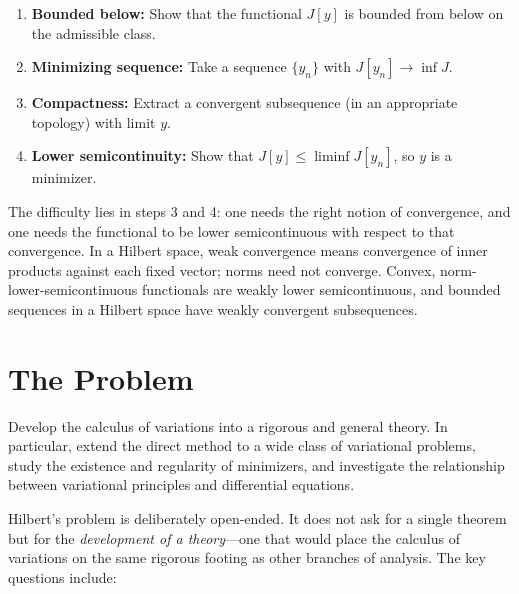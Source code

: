 \begin{enumerate}
    \item \textbf{Bounded below:} Show that the functional $J[y]$ is bounded from below on the admissible class.
    \item \textbf{Minimizing sequence:} Take a sequence $\{y_n\}$ with $J[y_n] \to \inf J$.
    \item \textbf{Compactness:} Extract a convergent subsequence (in an appropriate topology) with limit $y$.
    \item \textbf{Lower semicontinuity:} Show that $J[y] \leq \liminf J[y_n]$, so $y$ is a minimizer.
\end{enumerate}

The difficulty lies in steps 3 and 4: one needs the right notion of convergence, and one needs the functional to be lower semicontinuous with respect to that convergence. In a Hilbert space, weak convergence means convergence of inner products against each fixed vector; norms need not converge. Convex, norm-lower-semicontinuous functionals are weakly lower semicontinuous, and bounded sequences in a Hilbert space have weakly convergent subsequences.

\section{The Problem}

\begin{problem_statement}
Develop the calculus of variations into a rigorous and general theory. In particular, extend the direct method to a wide class of variational problems, study the existence and regularity of minimizers, and investigate the relationship between variational principles and differential equations.
\end{problem_statement}

Hilbert's problem is deliberately open-ended. It does not ask for a single theorem but for the \emph{development of a theory}---one that would place the calculus of variations on the same rigorous footing as other branches of analysis. The key questions include:

